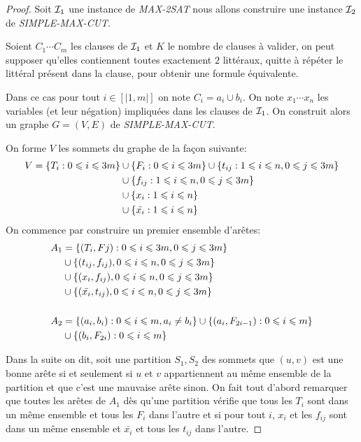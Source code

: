 \documentclass{standalone}
\begin{document}
\begin{proof}
	Soit $\mathcal I_1$ une instance de \textit{MAX-2SAT} nous allons construire une instance $\mathcal I_2$ de \textit{SIMPLE-MAX-CUT}.
	
	Soient $C_1 \cdots C_m$ les clauses de $\mathcal I_1$ et $K$ le nombre de clauses à valider, on peut supposer qu'elles contiennent toutes exactement $2$ littéraux, quitte à répéter le littéral présent dans la clause, pour obtenir une formule équivalente.
	
	Dans ce cas pour tout $i \in [|1, m|]$ on note $C_i = a_i \cup b_i$. On note $x_1 \cdots x_n$ les variables (et leur négation) impliquées dans les clauses de $\mathcal I_1$. On construit alors un graphe  $G=(V,E)$ de \textit{SIMPLE-MAX-CUT}.
	
	On forme $V$ les sommets du graphe de la façon suivante:
	\begin{align*}
		V = \left\{ T_i : 0 \leqslant i \leqslant 3m\right\} &\cup \left\{ F_i : 0 \leqslant i \leqslant 3m\right\} \cup \left\{ t_{ij} : 1 \leqslant i \leqslant n, 0\leqslant j \leqslant 3m\right\} \\ &\cup \left\{ f_{ij} : 1 \leqslant i \leqslant n, 0\leqslant j \leqslant 3m\right\} \\
			&\cup\left\{ x_i : 1 \leqslant i \leqslant n\right\} \\
			&\cup\left\{ \bar{x_i} : 1 \leqslant i \leqslant n\right\}
	\end{align*}
	On commence par construire un premier ensemble d'arêtes:	
	\begin{align*}
		A_1 &= \left\{ (T_i, Fj) : 0 \leqslant i \leqslant 3m, 0 \leqslant j \leqslant 3m \right\} \\
			&\cup \left\{ (t_{ij}, f_{ij}), 0 \leqslant i \leqslant n, 0 \leqslant j \leqslant 3m\right\} \\
			&\cup \left\{ (x_i, f_{ij}), 0 \leqslant i \leqslant n, 0 \leqslant j \leqslant 3m\right\} \\
			&\cup \left\{ (\bar{x_i}, t_{ij}), 0 \leqslant i \leqslant n, 0 \leqslant j \leqslant 3m\right\} \\
			\\
		A_2 &= \left\{ (a_i,b_i): 0 \leqslant i \leqslant m, a_i \not= b_i\right\} \cup \left\{ (a_i, F_{2i-1}) : 0 \leqslant i \leqslant m\right\} \\
			&\cup \left\{ (b_i, F_{2i}) : 0 \leqslant i \leqslant m\right\}
	\end{align*}
	
	Dans la suite on dit, soit une partition $S_1, S_2$ des sommets que $(u, v)$ est une bonne arête si et seulement si $u$ et $v$ appartiennent au même ensemble de la partition et que c'est une mauvaise arête sinon. On fait tout d'abord remarquer que toutes les arêtes de $A_1$ dès qu'une partition vérifie que tous les $T_i$ sont dans un même ensemble et tous les $F_i$ dans l'autre et si pour tout $i$, $x_i$ et les $f_{ij}$ sont dans un même ensemble et $\bar{x_i}$ et tous les $t_{ij}$ dans l'autre.
	

\end{proof}
\end{document}
